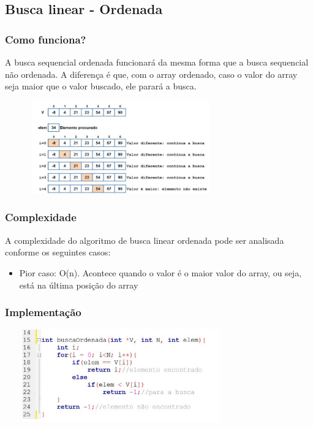 \documentclass{report}
\begin{document}
	\subsection{Busca linear - Ordenada}
	\subsubsection{Como funciona?}
	A busca sequencial ordenada funcionará da mesma forma que a busca sequencial não ordenada. A diferença é que, com o array ordenado, caso o valor do array seja maior que o valor buscado, ele parará a busca.
	
	\begin{center}
	
	\includegraphics[width=10cm,height=4cm,keepaspectratio=false]{imagens/blinearordenada.png}
	
	\end{center}
	
	\subsubsection{Complexidade}
	
	A complexidade do algoritmo de busca linear ordenada pode ser analisada conforme os seguintes casos:
	
	\begin{itemize}
		\item Pior caso: O(n). Acontece quando o valor é o maior valor do array, ou seja, está na última posição do array
	\end{itemize}
	
	\subsubsection{Implementação}
	
	\begin{center}
		
		\includegraphics[width=10cm,height=4cm,keepaspectratio=false]{imagens/blinearordenadafuncionamento.png}
		
	\end{center}
	
\end{document}
